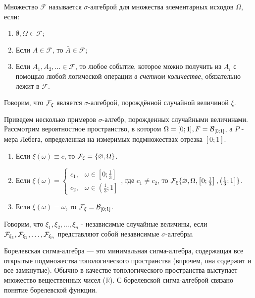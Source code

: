 \begin{definition}
	Множество $\mathcal{F}$ называется $\sigma$-алгеброй для множества элементарных исходов $\Omega$, если:
	\begin{enumerate}
		\item $\emptyset, \Omega \in \mathcal{F}$;
		\item Если $A \in \mathcal{F}$, то $\bar A \in \mathcal{F}$;
		\item Если $A_1, A_2, \dots \in \mathcal{F}$, то любое событие, которое можно получить из $A_i$ с помощью любой логической операции \textit{в счетном количестве}, обязательно лежит в $\mathcal{F}$.
	\end{enumerate}
\end{definition}

\begin{definition}
	Говорим, что ${\mathcal F}_{\xi}$ является $\sigma$-алгеброй, порождённой случайной величиной $\xi$.
\end{definition}

Приведем несколько примеров $\sigma$-алгебр, порожденных случайными величинами. Рассмотрим вероятностное пространство, в котором $\Omega = [0; 1], F = {\mathcal{B}}_{[0; 1]}$, а $P$ - мера Лебега, определенная на измеримых подмножествах отрезка $[0; 1]$.
\begin{enumerate}
	\item Если $\xi (\omega) \equiv c$, то ${\mathcal F}_{\xi} = \{ \varnothing, \Omega \}$.
	\item Если $\xi (\omega) = \begin{cases} c_1, & \omega \in \left[ 0; \frac{1}{3} \right] \\ c_2, & \omega \in \left( \frac{1}{3}; 1 \right] \end{cases}$, где $c_1 \ne c_2$, то ${\mathcal F}_{\xi} \{ \varnothing, \Omega, \left[0; \frac{1}{3}\right], \left(\frac{1}{3}; 1\right] \}$.
	\item Если $\xi(\omega) = \omega$, то ${\mathcal F}_{\xi} = {\mathcal{B}}_{[0;1]}$.
\end{enumerate}

\begin{definition}
	Говорим, что $\xi_1, \xi_2, \dots, \xi_n$ - независимые случайные величины, если ${\mathcal F}_{\xi_1}, {\mathcal F}_{\xi_2}, \dots, {\mathcal F}_{\xi_n}$ представляют собой независимые $\sigma$-алгебры.
\end{definition}

\begin{definition}
	Борелевская сигма-алгебра — это минимальная сигма-алгебра, содержащая все открытые подмножества топологического пространства (впрочем, она содержит и все замкнутые). Обычно в качестве топологического пространства выступает множество вещественных чисел ($\mathbb{R}$). С борелевской сигма-алгеброй связано понятие борелевской функции.
\end{definition}

